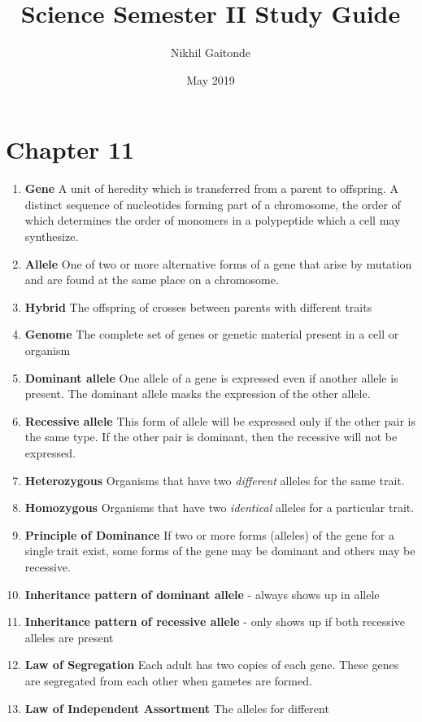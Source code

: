 \documentclass[9pt]{article}
\title{Science Semester II Study Guide}
\author{Nikhil Gaitonde }
\date{May 2019}
\begin{document}
\maketitle

\section*{Chapter 11}
\begin{enumerate}
\item {\bf Gene}
A unit of heredity which is transferred from a parent to offspring. A distinct sequence of nucleotides forming part of a chromosome, the order of which determines the order of monomers in a polypeptide which a cell may synthesize.
\item {\bf Allele}
One of two or more alternative forms of a gene that arise by mutation and are found at the same place on a chromosome.
\item {\bf Hybrid}
The offspring of crosses between parents with different traits
\item {\bf Genome}
The complete set of genes or genetic material present in a cell or organism
\item {\bf Dominant allele}
One allele of a gene is expressed even if another allele is present. The dominant allele masks the expression of the other allele.
\item {\bf Recessive allele}
This form of allele will be expressed only if the other pair is the same type. If the other pair is dominant, then the recessive will not be expressed.
\item {\bf Heterozygous}
Organisms that have two {\em different} alleles for the same trait.
\item {\bf Homozygous}
Organisms that have two {\em identical} alleles for a particular trait.
\item {\bf Principle of Dominance} If two or more forms (alleles) of
  the gene for a single trait exist, some forms of the gene may be
  dominant and others may be recessive.
\item {\bf Inheritance pattern of dominant allele} - always shows up in allele
\item {\bf Inheritance pattern of recessive allele} - only shows up if both recessive alleles are present
\item {\bf Law of Segregation} Each adult has two copies of each
  gene. These genes are segregated from each other when gametes are
  formed.
\item {\bf Law of Independent Assortment} The alleles for different

\end{enumerate}
\end{document}
